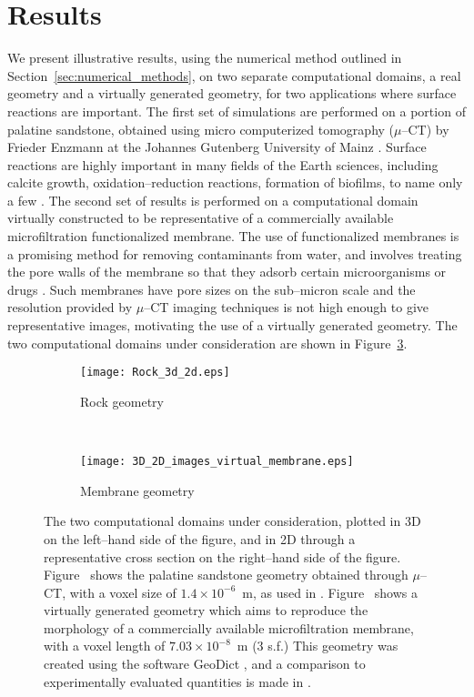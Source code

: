 \documentclass[preprint, 1p, authoryear]{elsarticle}
\begin{document}
\section{Results}
\label{sec:Results}



We present illustrative results, using the numerical method outlined in Section~\ref{sec:numerical_methods}, on  two separate computational domains, a real geometry and a virtually generated geometry, for two applications where surface reactions are important. The first set of  simulations are performed on a portion of  palatine sandstone, obtained using micro computerized tomography ($\mu$--CT) by Frieder Enzmann at the Johannes Gutenberg University of Mainz  \citep{Becker2011Combining}. Surface reactions are highly important in many 
fields of the Earth sciences, including calcite growth, oxidation--reduction reactions, formation of 
biofilms, to name only a few \citep{Steefel2005Reactive}.  The second set of results is performed  on a
computational domain virtually constructed to be representative of a commercially available microfiltration functionalized membrane. The use of functionalized 
membranes is a promising method for removing contaminants from water, and involves treating the pore walls of the membrane so that they adsorb  certain microorganisms  
or drugs \citep{Ulbricht2006Advanced}.  Such membranes have pore sizes on the sub--micron scale and    the resolution provided by $\mu$--CT imaging techniques is not high enough to give representative images, motivating the use of a virtually generated  geometry. The two computational domains under consideration are shown in Figure~\ref{fig:Computational_geometries}. 





\begin{figure}
\centering
\begin{subfigure}[c]{0.8\textwidth}
\texttt{[image: Rock\_3d\_2d.eps]} 
\caption{Rock geometry}
\label{fig:Rock_geometry}
\end{subfigure}
\\
\begin{subfigure}[c]{0.8\textwidth}
\texttt{[image: 3D\_2D\_images\_virtual\_membrane.eps]}
\caption{Membrane geometry}
\label{fig:Membrane_geometry}
\end{subfigure}
\caption{The two computational domains under consideration, plotted in 3D on the left--hand side of the figure, and in 2D through a representative cross section on the right--hand side of the figure.  Figure~ shows the  palatine sandstone geometry obtained through $\mu$--CT,  with a voxel size of $1.4 \times 10^{-6}$~$\mathrm{m}$, as used in \citet{Becker2011Combining}. Figure~ shows a virtually generated geometry which aims to reproduce the morphology of a commercially available microfiltration membrane, with a voxel length of $7.03\times 10^{-8}$~$\mathrm{m}$ (3 s.f.)  This geometry was created using the software GeoDict \citep{Geodict}, and a comparison to experimentally evaluated quantities is made in \citet{Nicolo2014Virtual}.  }  
\label{fig:Computational_geometries}
\end{figure}
\end{document}
